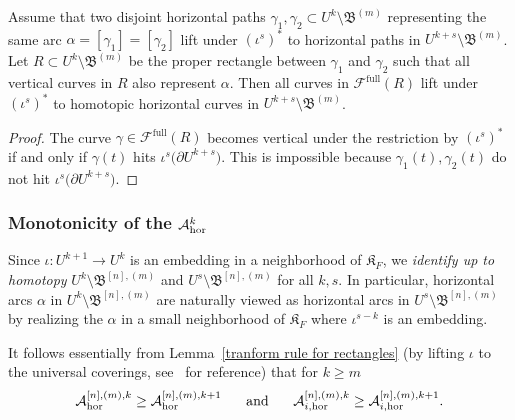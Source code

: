 \documentclass{amsart}
\newcommand\full{{\operatorname{full}}}
\newcommand{\filled}{{\mathfrak K }}
\newcommand{\bbush}{{\boldsymbol {\mathfrak B} }}
\newcommand{\1}{{\mathbb 1 }}
\newcommand{\Fam}{{\mathcal F}}
\renewcommand{\AA}{{\mathcal A}}
\begin{document}
\begin{lem}\label{lem:restr:buffers}
Assume that two disjoint horizontal paths $\gamma_1,\gamma_2\subset U^{k}\setminus \bbush^{(m)}$ representing the same arc  $\alpha=[\gamma_1]=[\gamma_2]$ lift under $(\iota^s)^*$ to horizontal paths in $U^{k+s}\setminus \bbush^{(m)}$. Let $R\subset U^{k}\setminus \bbush^{(m)}$ be the proper rectangle between $\gamma_1$ and $\gamma_2$ such that all vertical curves in $R$ also represent $\alpha$. Then all curves in $\Fam^\full(R)$ lift under $(\iota^s)^*$ to homotopic horizontal curves in $U^{k+s}\setminus \bbush^{(m)}$. 
\end{lem}
\begin{proof}
The curve $\gamma\in \Fam^\full(R)$ becomes vertical under the restriction by $(\iota^s)^*$ if and only if $\gamma(t)$ hits $\iota^s\big(\partial U^{k+s}\big)$. This is impossible because $\gamma_1(t),\gamma_2(t)$ do not hit $\iota^s\big(\partial U^{k+s}\big)$. 
\end{proof}

\subsubsection{Monotonicity of the $\AA^{k}_\hor$} \label{sss:monot:AA^k} Since $\iota\colon U^{k+1}\to U^k$ is an embedding in a neighborhood of $\filled_F$, we \emph{identify up to homotopy} $U^k\setminus \bbush^{[n],(m)}$ and $U^s\setminus \bbush^{[n],(m)}$ for all $k,s$. In particular, horizontal arcs $\alpha$ in $U^k\setminus \bbush^{[n],(m)}$ are naturally viewed as horizontal arcs in $U^s\setminus \bbush^{[n],(m)}$ by realizing the $\alpha$ in a small neighborhood of $\filled_F$ where $\iota^{s-k}$ is an embedding.


It follows essentially from Lemma~\ref{tranform rule for rectangles} (by lifting $\iota$ to the universal coverings, see~\cite[\S 3.5]{K} for reference) that for $k\ge m$
\begin{equation}
\label{eq:sss:monot:AA^k}
\AA^{[n],(m),k}_\hor \ge  \AA^{[n],(m),k+1}_\hor\hspace{0.5cm} \text{ and } \hspace{0.5cm}  \AA^{[n],(m),k}_{i,\hor} \ge  \AA_{i,\hor}^{[n],(m),k+1}.
\end{equation}
\end{document}
